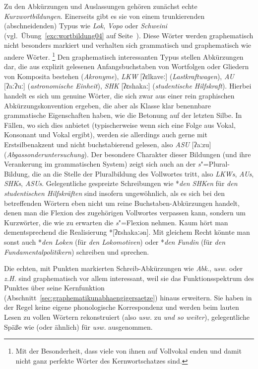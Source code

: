 Zu den Abkürzungen und Auslassungen gehören zunächst echte \textit{Kurzwortbildungen}.
Einerseits gibt es sie von einem trunkierenden (abschneidenden) Typus wie \textit{Lok}, \textit{Vopo} oder \textit{Schweini} (vgl.\ Übung~\ref{exc:wortbildung04} auf Seite~\pageref{exc:wortbildung04}).
Diese Wörter werden graphematisch nicht besonders markiert und verhalten sich grammatisch und graphematisch wie andere Wörter.%
\footnote{Mit der Besonderheit, dass viele von ihnen auf Vollvokal enden und damit nicht ganz perfekte Wörter des Kernwortschatzes sind.}
Den graphematisch interessanten Typus stellen Abkürzungen dar, die aus explizit gelesenen Anfangsbuchstaben von Wortfolgen oder Gliedern von Komposita bestehen (\textit{Akronyme}), \zB \textit{LKW} [ʔɛlkaveː] (\textit{Lastkraftwagen}), \textit{AU} [ʔaːʔuː] (\textit{astronomische Einheit}), \textit{SHK} [ʔɛshakaː] (\textit{studentische Hilfskraft}).
Hierbei handelt es sich um genuine Wörter, die sich zwar aus einer rein graphischen Abkürzungskonvention ergeben, die aber als Klasse klar benennbare grammatische Eigenschaften haben, wie \zB die Betonung auf der letzten Silbe.
In Fällen, wo sich dies anbietet (typischerweise wenn sich eine Folge aus Vokal, Konsonant und Vokal ergibt), werden sie allerdings auch gerne mit Erstsilbenakzent und nicht buchstabierend gelesen, also \textit{ASU} [ʔaːzu] (\textit{Abgassonderuntersuchung}).
Der besondere Charakter dieser Bildungen (und ihre Verankerung im grammatischen System) zeigt sich auch an der \textit{s}"=Plural-Bildung, die an die Stelle der Pluralbildung des Vollwortes tritt, also \textit{LKWs}, \textit{AUs}, \textit{SHKs}, \textit{ASUs}.
Gelegentliche gespreizte Schreibungen wie *\textit{den SHKen} für \textit{den studentischen Hilfskräften} sind insofern ungewöhnlich, als es sich bei den betreffenden Wörtern eben nicht um reine Buchstaben-Abkürzungen handelt, denen man die Flexion des zugehörigen Vollwortes verpassen kann, sondern um Kurzwörter, die wie zu erwarten die \textit{s}"=Flexion nehmen.
Kaum hört man dementsprechend die Realisierung *[ʔɛshakaːən].
Mit gleichem Recht könnte man sonst auch *\textit{den Loken} (für \textit{den Lokomotiven}) oder *\textit{den Fundin} (für \textit{den Fundamentalpolitikern}) schreiben und sprechen.

Die echten, mit Punkten markierten Schreib-Abkürzungen wie \textit{Abk.}, \textit{usw.} oder \textit{z.H.} sind graphematisch vor allem interessant, weil sie das Funktionsspektrum des Punktes über seine Kernfunktion (Abschnitt~\ref{sec:graphematikunabhaengigersaetze}) hinaus erweitern.
Sie haben in der Regel keine eigene phonologische Korrespondenz und werden beim lauten Lesen zu vollen Wörtern rekonstruiert (also \zB \textit{usw.} zu \textit{und so weiter}), gelegentliche Späße wie \zB [ʔʊzəvə] (oder ähnlich) für \textit{usw.} ausgenommen.

